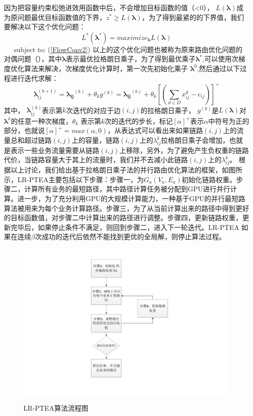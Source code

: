 因为把容量约束松弛进效用函数中后，不会增加目标函数的值（<0）， $L(\mathbf{\lambda})$成为原问题最优目标函数值的下界，$z^* \ge L(\mathbf{\lambda})$，为了得到最紧的的下界值，我们要解决以下这个优化问题：
 \begin{equation}\label{dual}
L^*(\mathbf{\lambda^*}) = maximize_{\mathbf{\lambda}}L(\mathbf{\lambda})
\end{equation}
~~~subject to: (\ref{FlowConv2})
 \vskip 0.2cm
  以上的这个优化问题也被称为原来路由优化问题的对偶问题（），其中$\mathbf{\lambda}$表示最优拉格朗日乘子，为了得到最优乘子$\mathbf{\lambda^*}$,可以使用次梯度优化算法来解决，次梯度优化计算时，第一次先初始化乘子 $\mathbf{\lambda}^0$,然后通过以下过程进行迭代求解：
\begin{equation}\label{iter}
   \mathbf{\lambda}_{ij}^{(k+1)} =\mathbf{\lambda_{ij}}^{(k)}+\theta_{k} g^{(k)}= \mathbf{\lambda_{ij}}^{(k)} + \theta_k[(\sum\limits_{d \in D}x_{ij}^d - c_{ij})]^+
\end{equation}
  其中， $\mathbf{\lambda}_{ij}^{(k)}$表示第$k$次迭代的对应于边$(i,j)$的拉格朗日乘子， $g^{(k)}$是$L(\mathbf{\lambda})$对$\mathbf{\lambda}^{k}$的任意一种次梯度，$\theta_k$ 表示第$k$次的迭代的步长，标记$[\alpha]^+$表示$\alpha$中符号为正的部分，也就说$[\alpha]^+=max(\alpha, 0)$，从表达式可以看出来如果链路$(i,j)$上的流量总和超过链路$(i,j)$上的容量，链路$(i,j)$上的$\lambda_{ij}^k$拉格朗日乘子会增加，也就是表示一些业务流量需要从链路$(i,j)$上移除，另外，为了避免产生负权重的链路代价，当链路容量大于其上的流量时，我们并不去减小此链路$(i,j)$上的$\lambda_{ij}^k$。
 根据以上讨论，我们给出基于拉格朗日乘子法的并行路由优化算法的框架，如图所示，LR-PTEA主要包括以下步骤：步骤一，为$G_a(V_a, E_a)$初始化链路权重。步骤二，计算所有业务的最短路径，其中路径计算任务被分配到GPU进行并行计算。进一步，为了充分利用GPU的大规模计算能力，一种基于GPU的并行最短路算法被用来为每个业务计算路径。步骤三，为了从当前计算出来的路径中得到更好的目标函数值，对步骤二中计算出来的路径进行调整。步骤四，更新链路权重，更新完毕后，如果停止条件不满足，则回到步骤二，进入下一轮迭代。LR-PTEA 如果在连续$\beta$次成功的迭代后依然不能找到更优的全局解，则停止算法过程。
\begin{figure}
  \begin{center}
    {\includegraphics[width=1\textwidth]{figures/lagrange.pdf}}
    \end{center}
  \caption{{\footnotesize{LR-PTEA算法流程图}}}
  \label{IterNum}
\end{figure}
